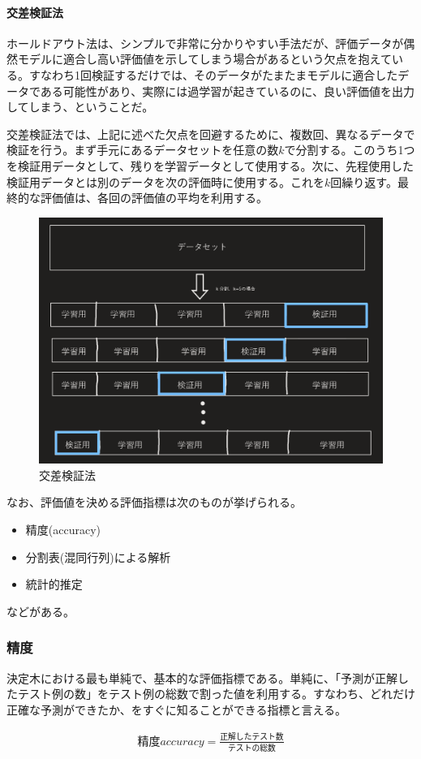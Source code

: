 \documentclass[dvipdfmx]{jsarticle}
\begin{document}
\paragraph{交差検証法}\par
ホールドアウト法は、シンプルで非常に分かりやすい手法だが、評価データが偶然モデルに適合し高い評価値を示してしまう場合があるという欠点を抱えている。すなわち1回検証するだけでは、そのデータがたまたまモデルに適合したデータである可能性があり、実際には過学習が起きているのに、良い評価値を出力してしまう、ということだ。\par
交差検証法では、上記に述べた欠点を回避するために、複数回、異なるデータで検証を行う。まず手元にあるデータセットを任意の数$k$で分割する。このうち1つを検証用データとして、残りを学習データとして使用する。次に、先程使用した検証用データとは別のデータを次の評価時に使用する。これを$k$回繰り返す。最終的な評価値は、各回の評価値の平均を利用する。
\begin{figure}[H]
  \centering
  \includegraphics[scale=0.3]{cross.PNG}
  \caption{交差検証法}
\end{figure}
なお、評価値を決める評価指標は次のものが挙げられる。
\begin{itemize}
  \item 精度(accuracy)
  \item 分割表(混同行列)による解析
  \item 統計的推定
\end{itemize}
などがある。
\subsubsection{精度}
決定木における最も単純で、基本的な評価指標である。単純に、「予測が正解したテスト例の数」をテスト例の総数で割った値を利用する。すなわち、どれだけ正確な予測ができたか、をすぐに知ることができる指標と言える。
\begin{center}
  \begin{align*}
    精度accuracy = \frac{正解したテスト数}{テストの総数}
  \end{align*}
\end{center}
\end{document}
